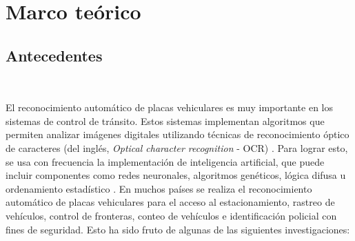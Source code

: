 \chapter{Marco teórico}\label{marcoteorico}
\section{Antecedentes}\\ \label{sec:antecendentes}

El reconocimiento automático de placas vehiculares es muy importante en los sistemas de control de tránsito. Estos sistemas implementan algoritmos que permiten analizar imágenes digitales utilizando técnicas de reconocimiento óptico de caracteres (del inglés, \textit{Optical character recognition} - OCR) \cite{noaman2012optical}. Para lograr esto, se usa con frecuencia la implementación de inteligencia artificial, que puede incluir componentes como redes neuronales, algoritmos genéticos, lógica difusa u ordenamiento estadístico \cite{Calderon2017}. En muchos países se realiza el reconocimiento automático de placas vehiculares para el acceso al estacionamiento, rastreo de vehículos, control de fronteras, conteo de vehículos e identificación policial con fines de seguridad. Esto ha sido fruto de algunas de las siguientes investigaciones: 

